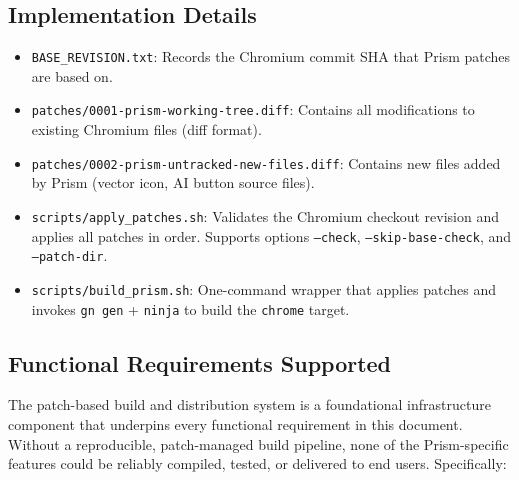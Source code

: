 \subsection{Implementation Details}
\begin{itemize}[leftmargin=*]
    \item \texttt{BASE\_REVISION.txt}: Records the Chromium commit SHA that Prism patches are based on.
    \item \texttt{patches/0001-prism-working-tree.diff}: Contains all modifications to existing Chromium files (diff format).
    \item \texttt{patches/0002-prism-untracked-new-files.diff}: Contains new files added by Prism (vector icon, AI button source files).
    \item \texttt{scripts/apply\_patches.sh}: Validates the Chromium checkout revision and applies all patches in order. Supports options \texttt{--check}, \texttt{--skip-base-check}, and \texttt{--patch-dir}.
    \item \texttt{scripts/build\_prism.sh}: One-command wrapper that applies patches and invokes \texttt{gn gen} + \texttt{ninja} to build the \texttt{chrome} target.
\end{itemize}

\needspace{8cm}
\subsection{Functional Requirements Supported}
The patch-based build and distribution system is a foundational infrastructure component that underpins every functional requirement in this document.
Without a reproducible, patch-managed build pipeline, none of the Prism-specific features could be reliably compiled, tested, or delivered to end users.
Specifically:

